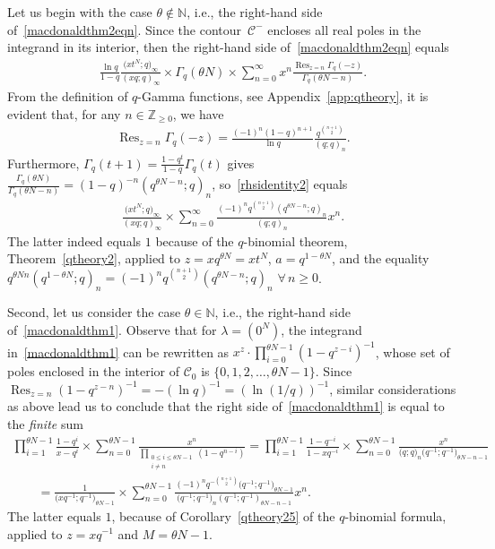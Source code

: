 \documentclass[pdftex]{sigma}
\numberwithin{equation}{section}
\newcommand{\Z}{\mathbb{Z}}
\newcommand{\N}{\mathbb{N}}
\newcommand{\CC}{\mathcal{C}}
\begin{document}
Let us begin with the case $\theta\notin\N$, i.e., the right-hand side of~\eqref{macdonaldthm2eqn}.
Since the contour~$\CC^-$ encloses all real poles in the integrand in its interior, then the right-hand side of~\eqref{macdonaldthm2eqn} equals
\begin{gather}\label{rhsidentity2}
\frac{\ln{q}}{1 - q}\frac{\big(xt^N; q\big)_{\infty}}{(xq; q)_{\infty}}\times\Gamma_q(\theta N)\times\sum_{n = 0}^{\infty}{x^n\frac{\operatorname{Res}_{z = n}{\Gamma_q(-z)}}{\Gamma_q(\theta N - n)}}.
\end{gather}
From the def\/inition of $q$-Gamma functions, see Appendix~\ref{app:qtheory}, it is evident that, for any $n\in\Z_{\geq 0}$, we have
\begin{gather*}
\operatorname{Res}_{z = n}{\Gamma_q(-z)} = \frac{(-1)^n(1-q)^{n+1}}{\ln{q}}\frac{q^{{n+1 \choose 2}}}{(q; q)_n}.
\end{gather*}
Furthermore, $\Gamma_q(t+1) = \frac{1 - q^t}{1 - q}\Gamma_q(t)$ gives $\frac{\Gamma_q(\theta N)}{\Gamma_q(\theta N - n)} = (1 - q)^{-n}(q^{\theta N - n}; q)_n$, so~\eqref{rhsidentity2} equals
\begin{gather*}
\frac{\big(xt^N; q\big)_{\infty}}{(xq; q)_{\infty}}\times\sum_{n = 0}^{\infty}{\frac{(-1)^nq^{{n+1 \choose 2}}(q^{\theta N - n}; q)_n}{(q; q)_n}x^n}.
\end{gather*}
The latter indeed equals $1$ because of the $q$-binomial theorem, Theorem~\ref{qtheory2}, applied to $z = xq^{\theta N} = xt^N$, $a = q^{1 - \theta N}$, and the equality $q^{\theta N n}(q^{1 - \theta N}; q)_n = (-1)^nq^{{n+1 \choose 2}}(q^{\theta N - n}; q)_n$ $\forall\, n\geq 0$.

Second, let us consider the case $\theta\in\N$, i.e., the right-hand side of~\eqref{macdonaldthm1}. Observe that for $\lambda=(0^N)$, the integrand in~\eqref{macdonaldthm1} can be rewritten as $x^z\cdot\prod\limits_{i=0}^{\theta N-1}{(1-q^{z-i})^{-1}}$, whose set of poles enclosed in the interior of $\CC_0$ is $\{0, 1, 2, \dots, \theta N-1\}$. Since $\operatorname{Res}_{z=n}{(1 - q^{z-n})^{-1}} = -(\ln{q})^{-1} = (\ln{(1/q)})^{-1}$, similar considerations as above lead us to conclude that the right side of~\eqref{macdonaldthm1} is equal to the \textit{finite} sum
\begin{gather*}
\prod_{i=1}^{\theta N - 1}{\frac{1 - q^i}{x - q^i}}\times\sum_{n=0}^{\theta N-1}{\frac{x^n}{\prod\limits_{\substack{0\leq i\leq \theta N - 1 \\ i \neq n}}{(1 - q^{n-i})}}} = \prod_{i=1}^{\theta N - 1}{\frac{1 - q^{-i}}{1 - xq^{-i}}}\times\sum_{n=0}^{\theta N-1}{\frac{x^n}{ \big(q; q)_n (q^{-1}; q^{-1}\big)_{\theta N - n - 1} }}\\
\qquad{} = \frac{1}{\big(xq^{-1}; q^{-1}\big)_{\theta N - 1}}\times\sum_{n=0}^{\theta N-1}{\frac{ (-1)^n q^{-{n + 1 \choose 2}} \big(q^{-1}; q^{-1}\big)_{\theta N - 1} }{ \big(q^{-1}; q^{-1}\big)_n (q^{-1}; q^{-1})_{\theta N - n - 1} }x^n}.
\end{gather*}
The latter equals $1$, because of Corollary~\ref{qtheory25} of the $q$-binomial formula, applied to $z = xq^{-1}$ and $M = \theta N - 1$.
\end{document}
